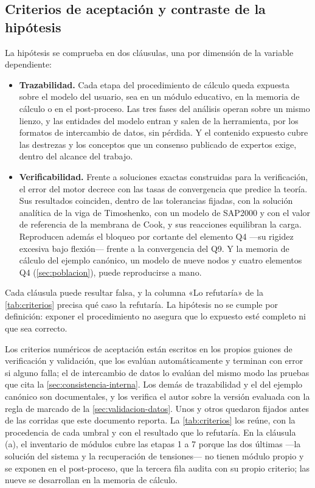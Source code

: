 \subsection{Criterios de aceptación y contraste de la hipótesis}
\label{sec:validacion-resultados}

La hipótesis se comprueba en dos cláusulas, una por dimensión de la variable dependiente:
\begin{itemize}
    \item[(a)] \textbf{Trazabilidad.} Cada etapa del procedimiento de cálculo queda expuesta sobre el modelo del usuario, sea en un módulo educativo, en la memoria de cálculo o en el post-proceso. Las tres fases del análisis operan sobre un mismo lienzo, y las entidades del modelo entran y salen de la herramienta, por los formatos de intercambio de datos, sin pérdida. Y el contenido expuesto cubre las destrezas y los conceptos que un consenso publicado de expertos exige, dentro del alcance del trabajo.
    \item[(b)] \textbf{Verificabilidad.} Frente a soluciones exactas construidas para la verificación, el error del motor decrece con las tasas de convergencia que predice la teoría. Sus resultados coinciden, dentro de las tolerancias fijadas, con la solución analítica de la viga de Timoshenko, con un modelo de SAP2000 y con el valor de referencia de la membrana de Cook, y sus reacciones equilibran la carga. Reproducen además el bloqueo por cortante del elemento Q4 ---su rigidez excesiva bajo flexión--- frente a la convergencia del Q9. Y la memoria de cálculo del ejemplo canónico, un modelo de nueve nodos y cuatro elementos Q4 (\autoref{sec:poblacion}), puede reproducirse a mano.
\end{itemize}
Cada cláusula puede resultar falsa, y la columna «Lo refutaría» de la \autoref{tab:criterios} precisa qué caso la refutaría. La hipótesis no se cumple por definición: exponer el procedimiento no asegura que lo expuesto esté completo ni que sea correcto.

Los criterios numéricos de aceptación están escritos en los propios guiones de verificación y validación, que los evalúan automáticamente y terminan con error si alguno falla; el de intercambio de datos lo evalúan del mismo modo las pruebas que cita la \autoref{sec:consistencia-interna}. Los demás de trazabilidad y el del ejemplo canónico son documentales, y los verifica el autor sobre la versión evaluada con la regla de marcado de la \autoref{sec:validacion-datos}. Unos y otros quedaron fijados antes de las corridas que este documento reporta. La \autoref{tab:criterios} los reúne, con la procedencia de cada umbral y con el resultado que lo refutaría. En la cláusula (a), el inventario de módulos cubre las etapas 1 a 7 porque las dos últimas ---la solución del sistema y la recuperación de tensiones--- no tienen módulo propio y se exponen en el post-proceso, que la tercera fila audita con su propio criterio; las nueve se desarrollan en la memoria de cálculo.

